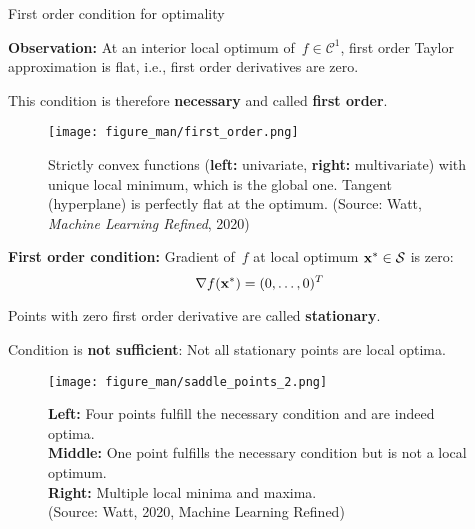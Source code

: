 \documentclass[11pt,compress,t,notes=noshow, xcolor=table]{beamer}
\begin{document}
\begin{vbframe}{First order condition for optimality}

\textbf{Observation:} At an interior local optimum of~$f\in\mathcal{C}^1$, first order Taylor approximation is flat, i.e., first order derivatives are zero.

\medskip

This condition is therefore \textbf{necessary} and called \textbf{first order}.

\begin{figure}
    \centering
    \texttt{[image: figure\_man/first\_order.png]}
    \caption*{\footnotesize
        Strictly convex functions (\textbf{left:} univariate, \textbf{right:} multivariate) with unique local minimum, which is the global one.
        Tangent (hyperplane) is perfectly flat at the optimum.
        (Source: Watt, \textit{Machine Learning Refined}, 2020)}
\end{figure}

\framebreak


\textbf{First order condition:}
Gradient of~$f$ at local optimum $\mathbf{x}^\ast \in \mathcal{S}$ is zero:
\vspace{-0.5\baselineskip}
\begin{equation*}
    \nabla f(\mathbf{x}^\ast) = (0,\ldots,0)^T
\end{equation*}


Points with zero first order derivative are called \textbf{stationary}.

\medskip

Condition is \textbf{not sufficient}: Not all stationary points are local optima.

\begin{figure}
    \centering
    \texttt{[image: figure\_man/saddle\_points\_2.png]}
    \captionsetup{justification=centering}
    \caption*{\footnotesize
        \textbf{Left:} Four points fulfill the necessary condition and are indeed optima. \\
        \textbf{Middle:} One point fulfills the necessary condition but is not a local optimum. \\
        \textbf{Right:} Multiple local minima and maxima. \\
        (Source: Watt, 2020, Machine Learning Refined)}
\end{figure}

\end{vbframe}
\end{document}
